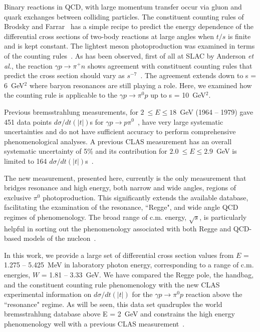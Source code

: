 \documentclass[aps,prc,twocolumn,floatfix,showpacs,preprintnumbers,amsmath,amssymb,superscriptaddress,linenumbers]{revtex4-1}
\begin{document}

Binary reactions in QCD, with large momentum transfer 
occur via gluon and quark exchanges between colliding particles. The 
constituent counting rules of Brodsky and Farrar~\cite{Brodsky:1973kr} 
has a simple recipe to predict the energy dependence of the 
differential cross sections of two-body reactions at large angles 
when $t/s$ is finite and is kept constant.  The lightest meson 
photoproduction was examined in terms of the counting 
rules~\cite{Anderson:1976ph,Jenkins:1995bk,Zhu:2002su,Chen:2009sda,
Kong:2015yzn}. As has been observed, first of all at SLAC by 
Anderson \textit{et al.}, the reaction $\gamma p\rightarrow\pi^+n$ 
shows agreement with constituent counting rules that predict the 
cross section should vary as $s^{-7}$~\cite{Anderson:1976ph}. The 
agreement extends down to s = 6~GeV$^2$ where baryon resonances are 
still playing a role.  Here, we examined how the counting rule is 
applicable to the $\gamma p\rightarrow\pi^0p$ up to s = 10~GeV$^2$. 

Previous bremsstrahlung measurements, for $2~\leq E\leq 
18$~GeV (1964 -- 1979) gave 451 data points $d\sigma/dt(|t|)$s for 
$\gamma p\rightarrow p\pi^0$~\cite{brem}, have very large systematic 
uncertainties and do not have sufficient accuracy to perform 
comprehensive phenomenological analyses.  A previous CLAS measurement 
has an overall systematic uncertainty of 5\% and its contribution for 
$2.0~\leq E\leq 2.9$~GeV is limited to 164 
$d\sigma/dt(|t|)$s~\cite{Dugger:2007bt}. 

The new measurement, presented here, currently is the only 
		measurement that bridges resonance and high energy, both narrow and wide 
		angles, regions of exclusive $\pi^0$ photoproduction. This significantly 
		extends the available database, facilitating the examination of the 
		resonance, ``Regge", and wide angle QCD regimes of phenomenology. The 
		broad range of c.m. energy, $\sqrt{s}$, is particularly helpful in 
		sorting out the phenomenology associated with both Regge and QCD-based 
		models of the nucleon~\cite{Kroll:2017hym}.

In this work, we provide a large set of differential 
cross section values from $E$ = 1.275 -- 5.425~MeV in laboratory photon 
energy, corresponding to a range of c.m. energies, $W$ = 1.81 -- 
3.33~GeV.  We have compared the Regge pole, the handbag, and the 
constituent counting rule phenomenology with the new CLAS experimental 
information on $d\sigma/dt(|t|)$ for the $\gamma p\rightarrow\pi^0p$ 
reaction above the ``resonance" regime. As will be seen, this data 
set quadruples the world bremsstrahlung database above E = 2~GeV and 
constrains the high energy phenomenology well with a previous CLAS 
measurement~\cite{Dugger:2007bt}.
\end{document}
